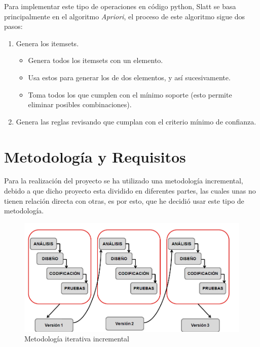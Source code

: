 \documentclass{cosas/tfg_domingo}
\begin{document}
Para implementar este tipo de operaciones en código python, Slatt se basa principalmente en el algoritmo \textit{Apriori}, el proceso de este algoritmo sigue dos pasos: \citep{morales2013reglas}

\begin{enumerate}
    \item Genera los itemsets.
    \begin{itemize}
        \item Genera todos los itemsets con un elemento.
        \item Usa estos para generar los de dos elementos, y así sucesivamente.
        \item Toma todos los que cumplen con el mínimo soporte (esto permite eliminar posibles combinaciones).
    \end{itemize}
    \item Genera las reglas revisando que cumplan con el criterio mínimo de confianza.
\end{enumerate}







\newpage
\section{Metodología y Requisitos}

Para la realización del proyecto se ha utilizado una metodología incremental, debido a que dicho proyecto esta dividido en diferentes partes, las cuales unas no tienen relación directa con otras, es por esto, que he decidió usar este tipo de metodología.

\begin{figure}[ht!] %
\begin{center}
\includegraphics[width=.6\linewidth]{imagenes/Metodologia.png}
\end{center}
\caption{Metodología iterativa incremental}
\label{fig_pro}
\end{figure}
\end{document}
